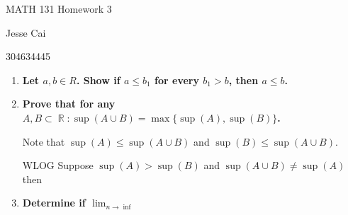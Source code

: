 \documentclass[10pt,a4paper]{article}
\DeclareMathOperator*{\R}{\mathbb{R}}
\begin{document}
MATH 131 Homework 3

Jesse Cai

304634445

\begin{enumerate}
    \item \textbf{Let $a, b \in R$. Show if $a \leq b_1$ for every $b_1 > b$, then $a \leq b$.}
    \item \textbf{Prove that for any $A,B \subset \R: \sup(A\cup B) = \max \{\sup(A), \sup(B)\}$.}

        Note that $\sup(A) \leq \sup(A\cup B) $ and $\sup(B) \leq \sup(A\cup B)$.

        WLOG Suppose $\sup(A) > \sup(B)$ and $\sup(A\cup B) \neq \sup(A)$ then 

    \item \textbf{Determine if $\lim_{n \to \inf}$ }

\end{enumerate}
\end{document}

